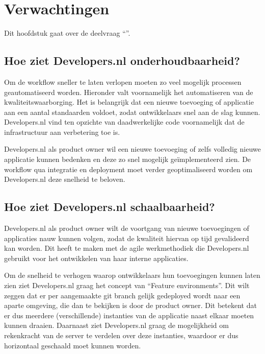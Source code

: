 \chapter{Verwachtingen}

\label{Verwachtingen}

Dit hoofdstuk gaat over de deelvraag \enquote{\deelverwachtingen}.

\section{Hoe ziet Developers.nl onderhoudbaarheid?}

Om de workflow sneller te laten verlopen moeten zo veel mogelijk processen geautomatiseerd worden. Hieronder valt voornamelijk het automatiseren van de kwaliteitswaarborging. Het is belangrijk dat een nieuwe toevoeging of applicatie aan een aantal standaarden voldoet, zodat ontwikkelaars snel aan de slag kunnen. Developers.nl vind ten opzichte van daadwerkelijke code voornamelijk dat de infrastructuur aan verbetering toe is.

Developers.nl als product owner wil een nieuwe toevoeging of zelfs volledig nieuwe applicatie kunnen bedenken en deze zo snel mogelijk geïmplementeerd zien. De workflow qua integratie en deployment moet verder geoptimaliseerd worden om Developers.nl deze snelheid te beloven.

\section{Hoe ziet Developers.nl schaalbaarheid?}

Developers.nl als product owner wilt de voortgang van nieuwe toevoegingen of applicaties nauw kunnen volgen, zodat de kwaliteit hiervan op tijd gevalideerd kan worden. Dit heeft te maken met de agile werkmethodiek die Developers.nl gebruikt voor het ontwikkelen van haar interne applicaties.

Om de snelheid te verhogen waarop ontwikkelaars hun toevoegingen kunnen laten zien ziet Developers.nl graag het concept van \enquote{Feature environments}. Dit wilt zeggen dat er per aangemaakte git branch gelijk gedeployed wordt naar een aparte omgeving, die dan te bekijken is door de product owner. Dit betekent dat er dus meerdere (verschillende) instanties van de applicatie naast elkaar moeten kunnen draaien. Daarnaast ziet Developers.nl graag de mogelijkheid om rekenkracht van de server te verdelen over deze instanties, waardoor er dus horizontaal geschaald moet kunnen worden.


